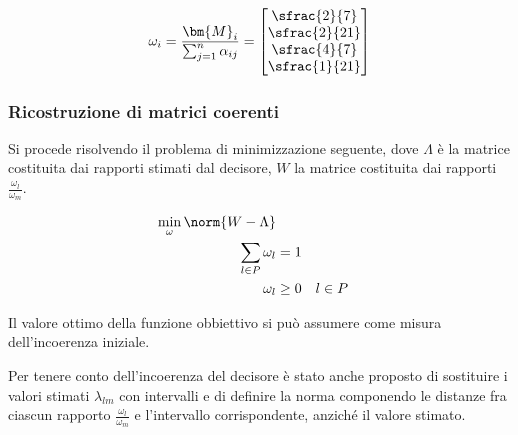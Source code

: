 \documentclass[\main/main.tex]{subfiles}
\begin{document}
\[
  \omega_i = \frac{\bm{M}_i}{\sum_{j=1}^n \alpha_{ij}} = \begin{bmatrix}
    \sfrac{2}{7}  \\
    \sfrac{2}{21} \\
    \sfrac{4}{7}  \\
    \sfrac{1}{21} \\
  \end{bmatrix}
\]


\subsubsection*{Ricostruzione di matrici coerenti}
Si procede risolvendo il problema di minimizzazione seguente, dove $\Lambda$ è la matrice costituita dai rapporti stimati dal decisore, $W$ la matrice costituita dai rapporti $\frac{\omega_l}{\omega_m}$.

\begin{align*}
  \min_\omega \norm{W - \Lambda}                 \\
  \sum_{l \in P} \omega_l & = 1                  \\
  \omega_l                & \geq 0 \quad l \in P
\end{align*}

Il valore ottimo della funzione obbiettivo si può assumere come misura dell'incoerenza iniziale.

Per tenere conto dell'incoerenza del decisore è stato anche proposto di sostituire i valori stimati $\lambda_{lm}$ con intervalli e di definire la norma componendo le distanze fra ciascun rapporto $\frac{\omega_l}{\omega_m}$ e l'intervallo corrispondente, anziché il valore stimato.
\end{document}
